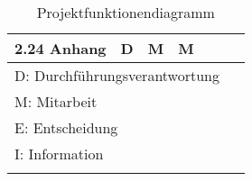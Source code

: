 \begin{longtable}{l|c|c|c|c|c|c}
  2.24 Anhang                            & D              & M           & M          &          &               &               \\
  \midrule
  \multicolumn{7}{l}{\small D: Durchführungsverantwortung}                                                                      \\
  \multicolumn{7}{l}{\small M: Mitarbeit}                                                                                       \\
  \multicolumn{7}{l}{\small E: Entscheidung}                                                                                    \\
  \multicolumn{7}{l}{\small I: Information}                                                                                     \\
  \bottomrule

  \caption{Projektfunktionendiagramm}
  \label{tab:projektfunktionendiagramm}
\end{longtable}
